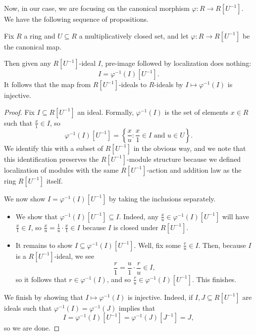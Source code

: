 Now, in our case, we are focusing on the canonical morphism $\varphi:R\to R\left[U^{-1}\right]$. We have the following sequence of propositions.
\begin{lemma} \label{lem:localidealsa}
	Fix $R$ a ring and $U\subseteq R$ a multiplicatively closed set, and let $\varphi:R\to R\left[U^{-1}\right]$ be the canonical map.
	
	Then given any $R\left[U^{-1}\right]$-ideal $I$, pre-image followed by localization does nothing:
	\[I=\varphi^{-1}(I)\left[U^{-1}\right].\]
	It follows that the map from $R\left[U^{-1}\right]$-ideals to $R$-ideals by $I\mapsto\varphi^{-1}(I)$ is injective.
\end{lemma}
\begin{proof}
	Fix $I\subseteq R\left[U^{-1}\right]$ an ideal. Formally, $\varphi^{-1}(I)$ is the set of elements $x\in R$ such that $\frac x1\in I$, so
	\[\varphi^{-1}(I)\left[U^{-1}\right]=\left\{\frac xu:\frac x1\in I\text{ and }u\in U\right\}.\]
	We identify this with a subset of $R\left[U^{-1}\right]$ in the obvious way, and we note that this identification preserves the $R\left[U^{-1}\right]$-module structure because we defined localization of modules with the same $R\left[U^{-1}\right]$-action and addition law as the ring $R\left[U^{-1}\right]$ itself.

	We now show $I=\varphi^{-1}(I)\left[U^{-1}\right]$ by taking the inclusions separately.
	\begin{itemize}
		\item We show that $\varphi^{-1}(I)\left[U^{-1}\right]\subseteq I$. Indeed, any $\frac xu\in\varphi^{-1}(I)\left[U^{-1}\right]$ will have $\frac x1\in I$, so $\frac xu=\frac1u\cdot\frac x1\in I$ because $I$ is closed under $R\left[U^{-1}\right]$.
		\item It remains to show $I\subseteq\varphi^{-1}(I)\left[U^{-1}\right]$. Well, fix some $\frac ru\in I$. Then, because $I$ is a $R\left[U^{-1}\right]$-ideal, we see
		\[\frac r1=\frac u1\cdot\frac ru\in I,\]
		so it follows that $r\in\varphi^{-1}(I)$, and so $\frac ru\in\varphi^{-1}(I)\left[U^{-1}\right]$. This finishes.
	\end{itemize}
	We finish by showing that $I\mapsto\varphi^{-1}(I)$ is injective. Indeed, if $I,J\subseteq R\left[U^{-1}\right]$ are ideals such that $\varphi^{-1}(I)=\varphi^{-1}(J)$ implies that
	\[I=\varphi^{-1}(I)\left[U^{-1}\right]=\varphi^{-1}(J)\left[J^{-1}\right]=J,\]
	so we are done.
\end{proof}
